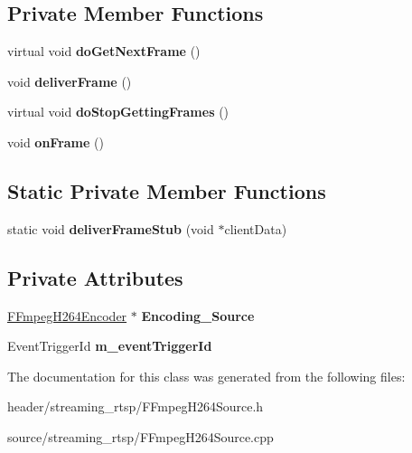 \subsection*{Private Member Functions}
\begin{DoxyCompactItemize}
\item 
\mbox{\label{class_m_e_s_a_i_1_1_f_fmpeg_h264_source_a967007b841277947e271d1012e7c7c95}} 
virtual void {\bfseries do\+Get\+Next\+Frame} ()
\item 
\mbox{\label{class_m_e_s_a_i_1_1_f_fmpeg_h264_source_a622a01cbb91ef6c7d61bf3c74ddead35}} 
void {\bfseries deliver\+Frame} ()
\item 
\mbox{\label{class_m_e_s_a_i_1_1_f_fmpeg_h264_source_a1a10200e6ac4565e6460438190162a69}} 
virtual void {\bfseries do\+Stop\+Getting\+Frames} ()
\item 
\mbox{\label{class_m_e_s_a_i_1_1_f_fmpeg_h264_source_ad7f4d5cd5f7c11b745d0cd4368ef157b}} 
void {\bfseries on\+Frame} ()
\end{DoxyCompactItemize}
\subsection*{Static Private Member Functions}
\begin{DoxyCompactItemize}
\item 
\mbox{\label{class_m_e_s_a_i_1_1_f_fmpeg_h264_source_ab41b999be77633742ad0ea561dfad290}} 
static void {\bfseries deliver\+Frame\+Stub} (void $\ast$client\+Data)
\end{DoxyCompactItemize}
\subsection*{Private Attributes}
\begin{DoxyCompactItemize}
\item 
\mbox{\label{class_m_e_s_a_i_1_1_f_fmpeg_h264_source_ab1f1e923491eb519f4963b2207252939}} 
\hyperlink{class_m_e_s_a_i_1_1_f_fmpeg_h264_encoder}{F\+Fmpeg\+H264\+Encoder} $\ast$ {\bfseries Encoding\+\_\+\+Source}
\item 
\mbox{\label{class_m_e_s_a_i_1_1_f_fmpeg_h264_source_a9a6f3a78d3c5c8040e64b7192bcd424f}} 
Event\+Trigger\+Id {\bfseries m\+\_\+event\+Trigger\+Id}
\end{DoxyCompactItemize}


The documentation for this class was generated from the following files\+:\begin{DoxyCompactItemize}
\item 
header/streaming\+\_\+rtsp/F\+Fmpeg\+H264\+Source.\+h\item 
source/streaming\+\_\+rtsp/F\+Fmpeg\+H264\+Source.\+cpp\end{DoxyCompactItemize}
